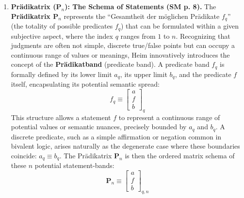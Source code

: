 \documentclass[12pt]{article}
\newcommand{\q}[1]{\enquote{#1}}
\begin{document}
\begin{enumerate}
    \item \textbf{Prädikatrix (\( \mathbf{P}_n \)): The Schema of Statements (SM p. 8).}
    The \textbf{Prädikatrix \( \mathbf{P}_n \)} represents the \q{Gesamtheit der möglichen Prädikate \( f_q \)} (the totality of possible predicates \( f_q \)) that can be formulated within a given subjective aspect, where the index \( q \) ranges from \( 1 \) to \( n \). Recognizing that judgments are often not simple, discrete true/false points but can occupy a continuous range of values or meanings, Heim innovatively introduces the concept of the \textbf{Pr\"{a}dikatband} (predicate band). A predicate band \( f_q \) is formally defined by its lower limit \( a_q \), its upper limit \( b_q \), and the predicate \( f \) itself, encapsulating its potential semantic spread:
    \begin{equation*}
    f_q \equiv \begin{bmatrix} a \\ f \\ b \end{bmatrix}_q
    \end{equation*}
    This structure allows a statement \( f \) to represent a continuous range of potential values or semantic nuances, precisely bounded by \( a_q \) and \( b_q \). A discrete predicate, such as a simple affirmation or negation common in bivalent logic, arises naturally as the degenerate case where these boundaries coincide: \( a_q \equiv b_q \). The Prädikatrix \( \mathbf{P}_n \) is then the ordered matrix schema of these \( n \) potential statement-bands: 
    \begin{equation*}
    \mathbf{P}_n \equiv \begin{bmatrix} a \\ f \\ b \end{bmatrix}_{q, n}
    \end{equation*}


\end{enumerate}
\end{document}
